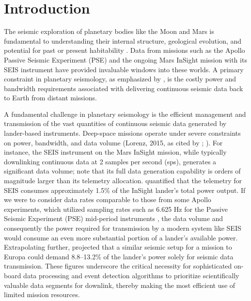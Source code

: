 \documentclass[conference]{IEEEtran}
\begin{document}
\section{Introduction}
    The seismic exploration of planetary bodies like the Moon and Mars is fundamental to understanding their internal
    structure, geological evolution, and potential for past or present habitability \cite{Lognonne2005, Lognonne2019}.
    Data from missions such as the Apollo Passive Seismic Experiment (PSE) \cite{Nakamura1982} and the ongoing Mars
    InSight mission with its SEIS instrument\cite{Lognonne2019} have provided invaluable windows into these worlds. A
    primary constraint in planetary seismology, as emphasized by \cite{Civilini2021}, is the costly power and bandwidth
    requirements associated with delivering continuous seismic data back to Earth from distant missions.

    A fundamental challenge in planetary seismology is the efficient management and transmission of the vast quantities
    of continuous seismic data generated by lander-based instruments. Deep-space missions operate under severe
    constraints on power, bandwidth, and data volume  (Lorenz, 2015, as cited by \cite{Civilini2021};
    \cite{Lognonne2019}). For instance, the SEIS instrument on the Mars InSight mission, while typically downlinking
    continuous data at 2 samples per second (sps), generates a significant data volume; \cite{Lognonne2019} note that
    its full data generation capability is orders of magnitude larger than its telemetry allocation. \cite{Civilini2021}
    quantified that the telemetry for SEIS consumes approximately 1.5\% of the InSight lander's total power output. If
    we were to consider data rates comparable to those from some Apollo experiments, which utilized sampling rates such
    as 6.625 Hz for the Passive Seismic Experiment (PSE) mid-period instruments \cite{Nunn2020}, the data volume and
    consequently the power required for transmission by a modern system like SEIS would consume an even more substantial
    portion of a lander's available power. Extrapolating further, \cite{Civilini2021} projected that a similar seismic
    setup for a mission to Europa could demand 8.8–13.2\% of the lander's power solely for seismic data transmission.
    These figures underscore the critical necessity for sophisticated on-board data processing and event detection
    algorithms to prioritize scientifically valuable data segments for downlink, thereby making the most efficient use
    of limited mission resources.
\end{document}
